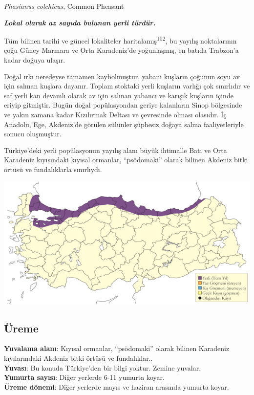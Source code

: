 \documentclass[
  letterpaper,
  DIV=11,
  numbers=noendperiod]{scrreprt}
\begin{document}
\emph{Phasianus colchicus}, Common Pheasant

\textbf{\emph{Lokal olarak az sayıda bulunan yerli türdür.}}

Tüm bilinen tarihi ve güncel lokaliteler
haritalamış\textsuperscript{102}, bu yayılış noktalarının çoğu Güney
Marmara ve Orta Karadeniz'de yoğunlaşmış, en batıda Trabzon'a kadar
doğuya ulaşır.

Doğal ırkı neredeyse tamamen kaybolmuştur, yabani kuşların çoğunun soyu
av için salınan kuşlara dayanır. Toplam stoktaki yerli kuşların varlığı
çok sınırlıdır ve saf yerli kan devamlı olarak av için salınan yabancı
ve karışık kuşların içinde eriyip gitmiştir. Bugün doğal popülasyondan
geriye kalanların Sinop bölgesinde ve yakın zamana kadar Kızılırmak
Deltası ve çevresinde olması olasıdır. İç Anadolu, Ege, Akdeniz'de
görülen sülünler şüphesiz doğaya salma faaliyetleriyle sonucu
oluşmuştur.

Türkiye'deki yerli popülasyonun yayılış alanı büyük ihtimalle Batı ve
Orta Karadeniz kıyısındaki kıyısal ormanlar, ``psödomaki'' olarak
bilinen Akdeniz bitki örtüsü ve fundalıklarla sınırlıydı.

\includegraphics{images/harita_Page_044.png}

\subsection{\texorpdfstring{\textbf{Üreme}}{Üreme}}\label{uxfcreme-8}

\textbf{Yuvalama alanı}: Kıyısal ormanlar, ``psödomaki'' olarak bilinen
Karadeniz kıyılarındaki Akdeniz bitki örtüsü ve fundalıklar..\\
\textbf{Yuvası}: Bu konuda Türkiye'den bir bilgi yoktur. Zemine
yuvalar.\\
\textbf{Yumurta sayısı}: Diğer yerlerde 6-11 yumurta koyar.\\
\textbf{Üreme dönemi}: Diğer yerlerde mayıs ve haziran arasında yumurta
koyar.
\end{document}
